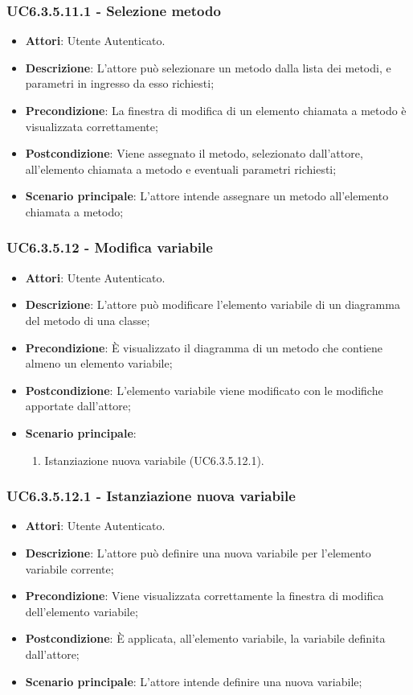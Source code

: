 \subsubsection{UC6.3.5.11.1 - Selezione metodo} 
\label{sssec:UC6.3.5.11.1} 
\begin{itemize} 
\item \textbf{Attori}: Utente Autenticato.
\item \textbf{Descrizione}: L'attore può selezionare un metodo dalla lista dei metodi, e parametri in ingresso da esso richiesti;
\item \textbf{Precondizione}: La finestra di modifica di un elemento chiamata a metodo è visualizzata correttamente;
\item \textbf{Postcondizione}: Viene assegnato il metodo, selezionato dall'attore, all'elemento chiamata a metodo e eventuali parametri richiesti;
\item \textbf{Scenario principale}: L'attore intende assegnare un metodo all'elemento chiamata a metodo;\end{itemize} 
\subsubsection{UC6.3.5.12 - Modifica variabile} 
\label{sssec:UC6.3.5.12} 
\begin{itemize} 
\item \textbf{Attori}: Utente Autenticato.
\item \textbf{Descrizione}: L'attore può modificare l'elemento variabile di un diagramma del metodo di una classe;
\item \textbf{Precondizione}: È visualizzato il diagramma di un metodo che contiene almeno un elemento variabile;
\item \textbf{Postcondizione}: L'elemento variabile viene modificato con le modifiche apportate dall'attore;
\item \textbf{Scenario principale}: \begin{enumerate}\item Istanziazione nuova variabile (UC6.3.5.12.1). 
 \end{enumerate}
\end{itemize} 
\subsubsection{UC6.3.5.12.1 - Istanziazione nuova variabile} 
\label{sssec:UC6.3.5.12.1} 
\begin{itemize} 
\item \textbf{Attori}: Utente Autenticato.
\item \textbf{Descrizione}: L'attore può definire una nuova variabile per l'elemento variabile corrente;
\item \textbf{Precondizione}: Viene visualizzata correttamente la finestra di modifica dell'elemento variabile;
\item \textbf{Postcondizione}: È applicata, all'elemento variabile, la variabile definita dall'attore;
\item \textbf{Scenario principale}: L'attore intende definire una nuova variabile;\end{itemize} 
